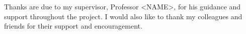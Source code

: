 \thesisacknowledgement

Thanks are due to my supervisor, Professor <NAME>, for his guidance and support throughout the project. I would also like to thank my colleagues and friends for their support and encouragement.